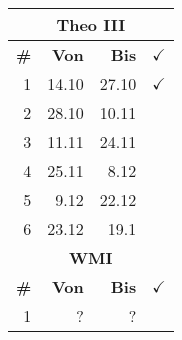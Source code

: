 \documentclass{article}
\begin{document}
\begin{table}
\begin{tabular}{r|r|r|l}
        \multicolumn{4}{c}{\textbf{Theo III}}\\
        \hline
        \hline
        \textbf{\#}&
        \textbf{Von}&
        \textbf{Bis}&
        $\checkmark$\\
        \hline
        \hline
        \color{teal}
        1&14.10&27.10&$\checkmark$\\
        \color{teal}
        2&28.10&10.11\\
        \color{teal}
        3&11.11&24.11\\
        4&25.11&8.12\\
        5&9.12&22.12\\
        6&23.12&19.1\\
        \hline
        \hline

        \multicolumn{4}{c}{\textbf{WMI}}\\
        \hline
        \hline
        \textbf{\#}&
        \textbf{Von}&
        \textbf{Bis}&
        $\checkmark$\\
        \hline
        \hline
        1&?&?
    \end{tabular}
\end{table}
\end{document}
